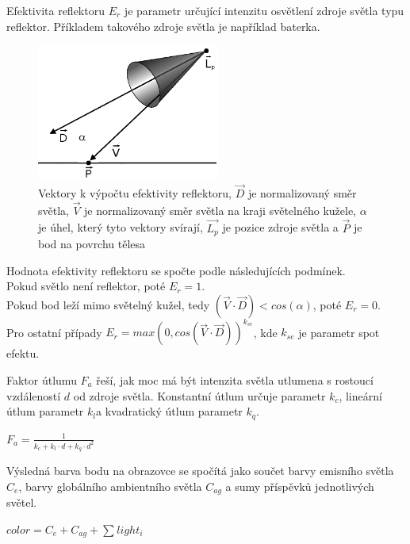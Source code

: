 \documentclass[11pt,twoside,a4paper]{book}
\begin{document}
Efektivita reflektoru $E_r$ je parametr určující intenzitu osvětlení zdroje světla typu reflektor. Příkladem takového zdroje světla je například baterka.
\begin{center}
\begin{figure}[h!]
\includegraphics[width=60mm]{figures/cutoff.png}
\caption{Vektory k výpočtu efektivity reflektoru, $\vec{D}$ je normalizovaný směr světla, $\vec{V}$ je normalizovaný směr světla na kraji světelného kužele, $\alpha$ je úhel, který tyto vektory svírají, $\vec{L_p}$ je pozice zdroje světla a $\vec{P}$ je bod na povrchu tělesa}
\end{figure}
\end{center}

Hodnota efektivity reflektoru se spočte podle následujících podmínek.\\
Pokud světlo není reflektor, poté $E_r = 1$.\\
Pokud bod leží mimo světelný kužel, tedy $(\vec{V} \cdot \vec{D}) < cos(\alpha)$, poté $E_r = 0$.\\
Pro ostatní případy $E_r = max(0, cos(\vec{V} \cdot \vec{D}))^{k_{se}}$, kde $k_{se}$ je parametr spot efektu.
\newpage

Faktor útlumu $F_a$ řeší, jak moc má být intenzita světla utlumena s rostoucí vzdáleností $d$ od zdroje světla. Konstantní útlum určuje parametr $k_c$, lineární útlum parametr $k_l$\linebreak a kvadratický útlum parametr $k_q$.
\begin{center}
$F_a = \frac{1}{k_c + k_l \cdot d + k_q \cdot d^2}$
\end{center}
\bigskip

Výsledná barva bodu na obrazovce se spočítá jako součet barvy emisního světla $C_e$, barvy globálního ambientního světla $C_{ag}$ a sumy příspěvků jednotlivých světel.
\begin{center}
$color = C_e + C_{ag} + \sum_{}{} light_i$
\end{center}
\end{document}

